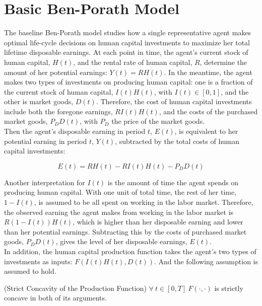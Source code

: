 \section{Basic Ben-Porath Model} \label{section:baseline}

The baseline Ben-Porath model studies how a single representative agent makes optimal life-cycle decisions on human capital investments to maximize her total lifetime disposable earnings. At each point in time, the agent's current stock of human capital, $H(t)$, and the rental rate of human capital, $R$, determine the amount of her potential earnings: $Y(t)=RH(t)$. In the meantime, the agent makes two types of investments on producing human capital: one is a fraction of the current stock of human capital, $I(t)H(t)$, with $I(t) \in [0,1]$, and the other is market goods, $D(t)$. Therefore, the cost of human capital investments include both the foregone earnings, $RI(t)H(t)$, and the costs of the purchased market goods, $P_DD(t)$, with $P_D$ the price of the market goods.\\
\indent Then the agent's disposable earning in period $t$, $E(t)$, is equivalent to her potential earning in period $t$, $Y(t)$, subtracted by the total costs of human capital investments:

\begin{equation}
E(t) = R H(t) -  R I(t) H(t) - P_{D} D(t) \label{eq:earnings}
\end{equation}

\indent Another interpretation for $I(t)$ is the amount of time the agent spends on producing human capital. With one unit of total time, the rest of her time, $1-I(t)$, is assumed to be all spent on working in the labor market. Therefore, the observed earning the agent makes from working in the labor market is $R(1-I(t))H(t)$, which is higher than her disposable earning and lower than her potential earnings. Subtracting this by the costs of purchased market goods, $P_DD(t)$, gives the level of her disposable earnings, $E(t)$.\\
\indent In addition, the human capital production function takes the agent's two types of investments as inputs: $F(I(t)H(t),D(t))$. And the following assumption is assumed to hold.

\begin{assumption} (Strict Concavity of the Production Function) \label{assumption:scpf}  $\forall \ t \in [0,T] \ F(\cdot, \cdot)$ is strictly concave in both of its arguments.
\end{assumption}

